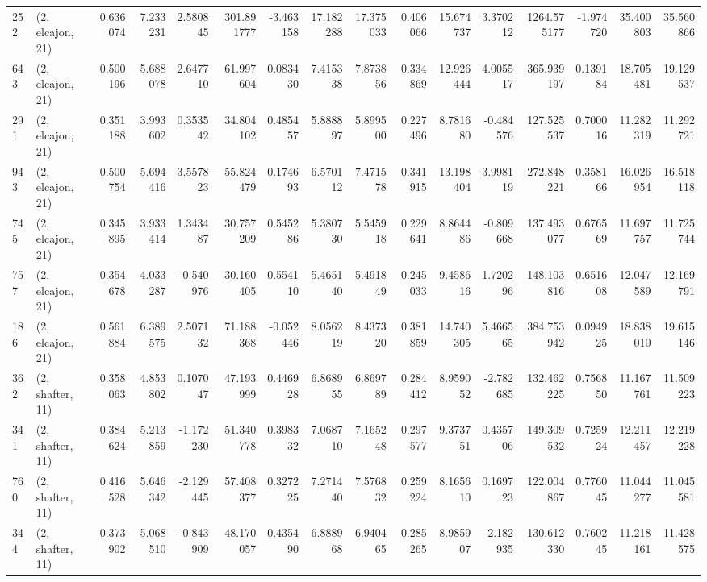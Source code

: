 \begin{tabular}{llrrrrrrrrrrrrrr}
252  &  (2, elcajon, 21) &   0.636074 &   7.233231 &   2.580845 &    301.891777 &   -3.463158 &   17.182288 &   17.375033 &  0.406066 &  15.674737 &   3.370212 &  1264.575177 &  -1.974720 &  35.400803 &  35.560866 \\
643  &  (2, elcajon, 21) &   0.500196 &   5.688078 &   2.647710 &     61.997604 &    0.083430 &    7.415338 &    7.873856 &  0.334869 &  12.926444 &   4.005517 &   365.939197 &   0.139184 &  18.705481 &  19.129537 \\
291  &  (2, elcajon, 21) &   0.351188 &   3.993602 &   0.353542 &     34.804102 &    0.485457 &    5.888897 &    5.899500 &  0.227496 &   8.781680 &  -0.484576 &   127.525537 &   0.700016 &  11.282319 &  11.292721 \\
943  &  (2, elcajon, 21) &   0.500754 &   5.694416 &   3.557823 &     55.824479 &    0.174693 &    6.570112 &    7.471578 &  0.341915 &  13.198404 &   3.998119 &   272.848221 &   0.358166 &  16.026954 &  16.518118 \\
745  &  (2, elcajon, 21) &   0.345895 &   3.933414 &   1.343487 &     30.757209 &    0.545286 &    5.380730 &    5.545918 &  0.229641 &   8.864486 &  -0.809668 &   137.493077 &   0.676569 &  11.697757 &  11.725744 \\
757  &  (2, elcajon, 21) &   0.354678 &   4.033287 &  -0.540976 &     30.160405 &    0.554110 &    5.465140 &    5.491849 &  0.245033 &   9.458616 &   1.720296 &   148.103816 &   0.651608 &  12.047589 &  12.169791 \\
186  &  (2, elcajon, 21) &   0.561884 &   6.389575 &   2.507132 &     71.188368 &   -0.052446 &    8.056219 &    8.437320 &  0.381859 &  14.740305 &   5.466565 &   384.753942 &   0.094925 &  18.838010 &  19.615146 \\
362  &  (2, shafter, 11) &   0.358063 &   4.853802 &   0.107047 &     47.193999 &    0.446928 &    6.868955 &    6.869789 &  0.284412 &   8.959052 &  -2.782685 &   132.462225 &   0.756850 &  11.167761 &  11.509223 \\
341  &  (2, shafter, 11) &   0.384624 &   5.213859 &  -1.172230 &     51.340778 &    0.398332 &    7.068710 &    7.165248 &  0.297577 &   9.373751 &   0.435706 &   149.309532 &   0.725924 &  12.211457 &  12.219228 \\
760  &  (2, shafter, 11) &   0.416528 &   5.646342 &  -2.129445 &     57.408377 &    0.327225 &    7.271440 &    7.576832 &  0.259224 &   8.165610 &   0.169723 &   122.004867 &   0.776045 &  11.044277 &  11.045581 \\
344  &  (2, shafter, 11) &   0.373902 &   5.068510 &  -0.843909 &     48.170057 &    0.435490 &    6.888968 &    6.940465 &  0.285265 &   8.985907 &  -2.182935 &   130.612330 &   0.760245 &  11.218161 &  11.428575 \\

\end{tabular}
